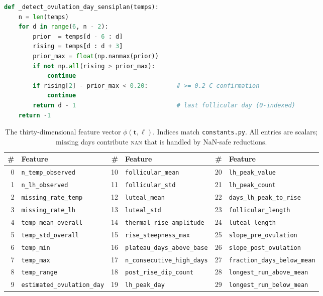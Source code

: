\documentclass[11pt,a4paper]{article}
\newcommand{\code}[1]{\texttt{\small #1}}
\newcommand{\file}[1]{\texttt{\small\color{NavyBlue!70!black}#1}}
\begin{document}
\begin{lstlisting}[language=Python,caption={The SENSIPLAN 3-over-6 detector, the
anchor feature for follicular/luteal partitioning (from \file{features.py}).}]
def _detect_ovulation_day_sensiplan(temps):
    n = len(temps)
    for d in range(6, n - 2):
        prior  = temps[d - 6 : d]
        rising = temps[d : d + 3]
        prior_max = float(np.nanmax(prior))
        if not np.all(rising > prior_max):
            continue
        if rising[2] - prior_max < 0.20:        # >= 0.2 C confirmation
            continue
        return d - 1                            # last follicular day (0-indexed)
    return -1
\end{lstlisting}

\begin{table}[H]
\centering
\caption{The thirty-dimensional feature vector $\phi(\bm{t},\bm{\ell})$.
Indices match \file{constants.py}. All entries are scalars; missing days
contribute \textsc{nan} that is handled by NaN-safe reductions.}
\label{tab:features}
\small
\begin{adjustbox}{max width=\textwidth}
\begin{tabular}{@{}rl rl rl@{}}
\toprule
\# & Feature & \# & Feature & \# & Feature\\
\midrule
0  & \code{n\_temp\_observed}        & 10 & \code{follicular\_mean}            & 20 & \code{lh\_peak\_value}\\
1  & \code{n\_lh\_observed}          & 11 & \code{follicular\_std}             & 21 & \code{lh\_peak\_count}\\
2  & \code{missing\_rate\_temp}      & 12 & \code{luteal\_mean}                & 22 & \code{days\_lh\_peak\_to\_rise}\\
3  & \code{missing\_rate\_lh}        & 13 & \code{luteal\_std}                 & 23 & \code{follicular\_length}\\
4  & \code{temp\_mean\_overall}      & 14 & \code{thermal\_rise\_amplitude}    & 24 & \code{luteal\_length}\\
5  & \code{temp\_std\_overall}       & 15 & \code{rise\_steepness\_max}        & 25 & \code{slope\_pre\_ovulation}\\
6  & \code{temp\_min}                & 16 & \code{plateau\_days\_above\_base}  & 26 & \code{slope\_post\_ovulation}\\
7  & \code{temp\_max}                & 17 & \code{n\_consecutive\_high\_days}  & 27 & \code{fraction\_days\_below\_mean}\\
8  & \code{temp\_range}              & 18 & \code{post\_rise\_dip\_count}      & 28 & \code{longest\_run\_above\_mean}\\
9  & \code{estimated\_ovulation\_day}& 19 & \code{lh\_peak\_day}               & 29 & \code{longest\_run\_below\_mean}\\
\bottomrule
\end{tabular}
\end{adjustbox}
\end{table}
\end{document}
